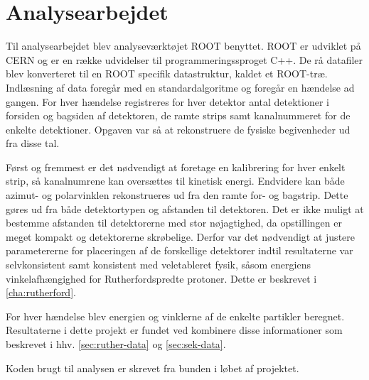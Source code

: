 \section{Analysearbejdet}
\label{sec:analyse}

Til analysearbejdet blev analyseværktøjet ROOT benyttet. ROOT er udviklet på CERN og er en række
udvidelser til programmeringssproget C++. De rå datafiler blev konverteret til en ROOT specifik
datastruktur, kaldet et ROOT-træ. Indlæsning af data foregår med en standardalgoritme og foregår en
hændelse ad gangen. For hver hændelse registreres for hver detektor antal detektioner i
forsiden og bagsiden af detektoren, de ramte strips samt kanalnummeret for de enkelte
detektioner. Opgaven var så at rekonstruere de fysiske begivenheder ud fra disse tal.

Først og fremmest er det nødvendigt at foretage en kalibrering for hver enkelt strip, så
kanalnumrene kan oversættes til kinetisk energi. Endvidere kan både azimut- og polarvinklen
rekonstrueres ud fra den ramte for- og bagstrip. Dette gøres ud fra både detektortypen og afstanden
til detektoren. Det er ikke muligt at bestemme afstanden til detektorerne med stor nøjagtighed, da
opstillingen er meget kompakt og detektorerne skrøbelige. Derfor var det nødvendigt at justere
parametererne for placeringen af de forskellige detektorer indtil resultaterne var selvkonsistent
samt konsistent med veletableret fysik, såsom energiens vinkelafhængighed for Rutherfordspredte
protoner. Dette er beskrevet i \cref{cha:rutherford}.

For hver hændelse blev energien og vinklerne af de enkelte partikler beregnet. Resultaterne i dette
projekt er fundet ved kombinere disse informationer som beskrevet i hhv. \cref{sec:ruther-data} og
\ref{sec:sek-data}.

Koden brugt til analysen er skrevet fra bunden i løbet af projektet.
